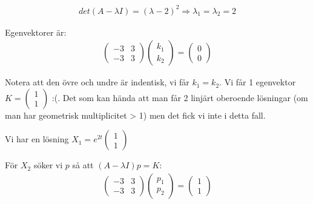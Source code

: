 \begin{equation*}
  \begin{gathered}
    det(A-\lambda I) = (\lambda-2)^2 \Rightarrow\lambda_1=\lambda_2=2
  \end{gathered}
\end{equation*}\par
\noindent Egenvektorer är:
\begin{equation*}
  \begin{gathered}
    \begin{pmatrix}-3&3\\-3&3\end{pmatrix}\begin{pmatrix}k_1\\k_2\end{pmatrix}=\begin{pmatrix}0\\0\end{pmatrix}
  \end{gathered}
\end{equation*}\par
\noindent Notera att den övre och undre är indentisk, vi får $k_1 = k_2$. Vi får 1 egenvektor $K=\begin{pmatrix}1\\1\end{pmatrix}$ :(. Det som kan hända att man får 2 linjärt oberoende lösningar (om man har geometrisk multiplicitet > 1) men det fick vi inte i detta fall.\par
\noindent Vi har en lösning $X_1 = e^{2t}\begin{pmatrix}1\\1\end{pmatrix}$
\par\bigskip
\noindent För $X_2$ söker vi $p$ så att $(A-\lambda I)p=K$:
\begin{equation*}
  \begin{gathered}
    \begin{pmatrix}-3&3\\-3&3\end{pmatrix}\begin{pmatrix}p_1\\p_2\end{pmatrix} = \begin{pmatrix}1\\1\end{pmatrix}
  \end{gathered}
\end{equation*}\par
